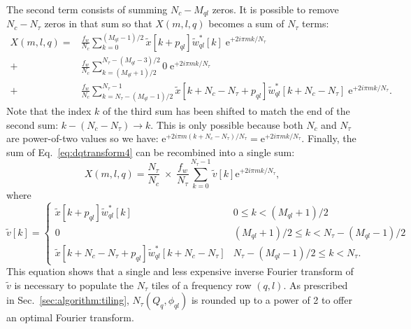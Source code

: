 The second term consists of summing $N_c-M_{ql}$ zeros. It is possible to remove $N_c-N_\tau$ zeros in that sum so that $X(m,l,q)$ becomes a sum of $N_\tau$ terms:
\begin{align}
  X(m, l, q)
  = & \frac{f_w}{N_c} \sum_{k=0}^{(M_{ql}-1)/2}{\tilde{x}[k+p_{ql}]\tilde{w}_{ql}^*[k] \; \mathrm{e}^{+2i\pi mk/N_\tau}} \\
  + & \frac{f_w}{N_c} \sum_{k=(M_{ql}+1)/2}^{N_\tau-(M_{ql}-3)/2}{0 \; \mathrm{e}^{+2i\pi mk/N_\tau}} \\
  + & \frac{f_w}{N_c} \sum_{k=N_\tau-(M_{ql}-1)/2}^{N_\tau-1}{\tilde{x}[k+N_c-N_\tau+p_{ql}]\tilde{w}_{ql}^*[k+N_c-N_\tau] \; \mathrm{e}^{+2i\pi mk/N_\tau}} .
  \label{eq:dqtransform4}
\end{align}
Note that the index $k$ of the third sum has been shifted to match the end of the second sum: $k-(N_c-N_\tau) \rightarrow k$. This is only possible because both $N_c$ and $N_\tau$ are power-of-two values so we have: $\mathrm{e}^{+2i\pi m(k+N_c-N_\tau)/N_\tau} = \mathrm{e}^{+2i\pi mk/N_\tau}$. Finally, the sum of Eq.~\ref{eq:dqtransform4} can be recombined into a single sum:
\begin{equation}
  X(m, l, q) = \frac{N_\tau}{N_c} \; \times \; \frac{f_w}{N_\tau} \sum_{k=0}^{N_\tau-1}{\tilde{v}[k]\mathrm{e}^{+2i\pi mk/N_\tau}},
  \label{eq:dqtransform5}
\end{equation}
where
\begin{equation}
  \tilde{v}[k] =
  \begin{cases}
    \tilde{x}[k+p_{ql}]\tilde{w}_{ql}^*[k]                     & 0 \le k < (M_{ql}+1)/2 \\
    0                                                        & (M_{ql}+1)/2 \le k < N_\tau-(M_{ql}-1)/2 \\
    \tilde{x}[k+N_c-N_\tau+p_{ql}]\tilde{w}_{ql}^*[k+N_c-N_\tau] & N_\tau-(M_{ql}-1)/2 \le k < N_\tau.
  \end{cases}
  \label{eq:v1}
\end{equation}
This equation shows that a single and less expensive inverse Fourier transform of $\tilde{v}$ is necessary to populate the $N_\tau$ tiles of a frequency row $(q,l)$. As prescribed in Sec.~\ref{sec:algorithm:tiling}, $N_\tau(Q_q, \phi_{ql})$ is rounded up to a power of 2 to offer an optimal Fourier transform.

